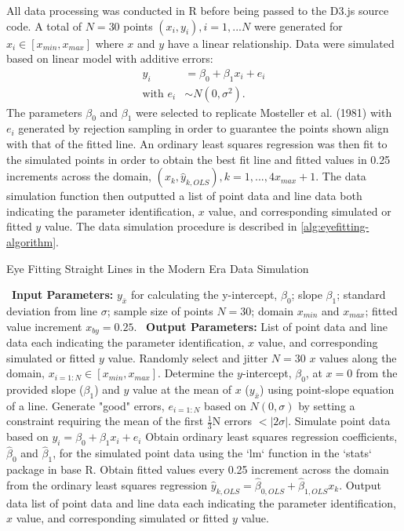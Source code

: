 \documentclass[print]{nuthesis}
\begin{document}
All data processing was conducted in R before being passed to the D3.js source code.
A total of \(N = 30\) points \((x_i, y_i), i = 1,...N\) were generated for \(x_i \in [x_{min}, x_{max}]\) where \(x\) and \(y\) have a linear relationship.
Data were simulated based on linear model with additive errors:
\begin{align}
y_i & = \beta_0 + \beta_1 x_i + e_i \\
\text{with } e_i & \sim N(0, \sigma^2). \nonumber
\end{align}
The parameters \(\beta_0\) and \(\beta_1\) were selected to replicate Mosteller et al. (1981) with \(e_i\) generated by rejection sampling in order to guarantee the points shown align with that of the fitted line.
An ordinary least squares regression was then fit to the simulated points in order to obtain the best fit line and fitted values in 0.25 increments across the domain, \((x_k, \hat y_{k,OLS}), k = 1, ..., 4 x_{max} +1\).
The data simulation function then outputted a list of point data and line data both indicating the parameter identification, \(x\) value, and corresponding simulated or fitted \(y\) value.
The data simulation procedure is described in \cref{alg:eyefitting-algorithm}.

\begin{algorithm}
  \caption{Eye Fitting Straight Lines in the Modern Era Data Simulation}\label{alg:eyefitting-algorithm}
  \begin{algorithmic}[1]
    \Statex \textbullet~\textbf{Input Parameters:} $y_{\bar{x}}$ for calculating the y-intercept, $\beta_0$; slope $\beta_1$; standard deviation from line $\sigma$; sample size of points $N = 30$; domain $x_{min}$ and $x_{max}$; fitted value increment $x_{by} = 0.25$.
    \Statex \textbullet~\textbf{Output Parameters:} List of point data and line data each indicating the parameter identification, $x$ value, and corresponding simulated or fitted $y$ value.
    \State Randomly select and jitter $N = 30$ $x$ values along the domain, $x_{i=1:N}\in [x_{min}, x_{max}]$.
    \State Determine the $y$-intercept, $\beta_0$, at $x = 0$ from the provided slope ($\beta_1$) and $y$ value at the mean of $x$ ($y_{\bar{x}}$) using point-slope equation of a line.
    \State Generate "good" errors, $e_{i = 1:N}$ based on $N(0,\sigma)$ by setting a constraint requiring the mean of the first $\frac{1}{3}\text{N}$ errors $< |2\sigma|.$
    \State Simulate point data based on $y_i = \beta_0 + \beta_1 x_i + e_i$
    \State Obtain ordinary least squares regression coefficients, $\hat\beta_0$ and $\hat\beta_1$, for the simulated point data using the `lm` function in the `stats` package in base R.
    \State Obtain fitted values every 0.25 increment across the domain from the ordinary least squares regression $\hat y_{k,OLS} = \hat\beta_{0,OLS} + \hat\beta_{1,OLS} x_k$.
    \State Output data list of point data and line data each indicating the parameter identification, $x$ value, and corresponding simulated or fitted $y$ value.
  \end{algorithmic}
\end{algorithm}
\end{document}
